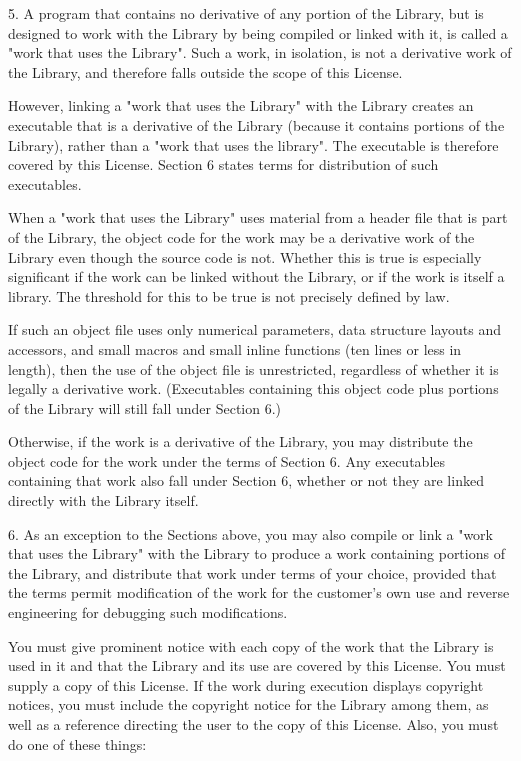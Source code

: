 \documentclass[a4paper,twoside]{tceusermanual}
\begin{document}
5. A program that contains no derivative of any portion of the
Library, but is designed to work with the Library by being
compiled or linked with it, is called a "work that uses the
Library".  Such a work, in isolation, is not a derivative work
of the Library, and therefore falls outside the scope of this
License.

However, linking a "work that uses the Library" with the Library
creates an executable that is a derivative of the Library
(because it contains portions of the Library), rather than a
"work that uses the library".  The executable is therefore
covered by this License. Section 6 states terms for distribution
of such executables.

When a "work that uses the Library" uses material from a header
file that is part of the Library, the object code for the work
may be a derivative work of the Library even though the source
code is not. Whether this is true is especially significant if
the work can be linked without the Library, or if the work is
itself a library.  The threshold for this to be true is not
precisely defined by law.

If such an object file uses only numerical parameters, data
structure layouts and accessors, and small macros and small
inline functions (ten lines or less in length), then the use of
the object file is unrestricted, regardless of whether it is
legally a derivative work.  (Executables containing this object
code plus portions of the Library will still fall under Section
6.)

Otherwise, if the work is a derivative of the Library, you may
distribute the object code for the work under the terms of
Section 6. Any executables containing that work also fall under
Section 6, whether or not they are linked directly with the
Library itself.
 
6. As an exception to the Sections above, you may also compile
or link a "work that uses the Library" with the Library to
produce a work containing portions of the Library, and
distribute that work under terms of your choice, provided that
the terms permit modification of the work for the customer's own
use and reverse engineering for debugging such modifications.

You must give prominent notice with each copy of the work that
the Library is used in it and that the Library and its use are
covered by this License.  You must supply a copy of this
License.  If the work during execution displays copyright
notices, you must include the copyright notice for the Library
among them, as well as a reference directing the user to the
copy of this License.  Also, you must do one of these things:
\end{document}
